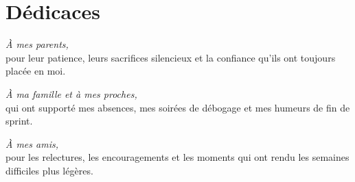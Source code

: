 \chapter*{Dédicaces}
\thispagestyle{empty}
\vspace*{1cm}
\begin{center}
\textit{À mes parents,}\\[4pt]
pour leur patience, leurs sacrifices silencieux et la confiance qu'ils ont toujours placée en moi.

\vspace{1cm}
\textit{À ma famille et à mes proches,}\\[4pt]
qui ont supporté mes absences, mes soirées de débogage et mes humeurs de fin de sprint.

\vspace{1cm}
\textit{À mes amis,}\\[4pt]
pour les relectures, les encouragements et les moments qui ont rendu les semaines difficiles plus légères.

\vspace{1cm}
\end{center}
